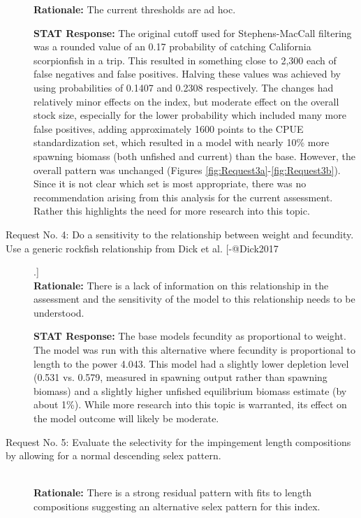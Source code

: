 \documentclass[12pt,]{article}
\begin{document}
\begin{description}
\textbf{Rationale:} The current thresholds are ad hoc.  
    
  
\textbf{STAT Response:} The original cutoff used for Stephens-MacCall filtering 
was a rounded value of an 0.17 probability of catching California scorpionfish 
in a trip. This resulted in something close to 2,300 each of false negatives 
and false positives. Halving these values was achieved by using probabilities 
of 0.1407 and 0.2308 respectively. The changes had relatively minor effects 
on the index, but  moderate effect on the overall stock size, especially for 
the lower probability which included many more false positives, adding approximately 1600
points to the CPUE standardization set, which resulted in a model with nearly 
10\% more spawning biomass (both unfished and current) than the base. However, 
the overall pattern was unchanged (Figures \ref{fig:Request3a}-\ref{fig:Request3b}). 
Since it is not clear which set is most 
appropriate, there was no recommendation arising from this analysis for the 
current assessment. Rather this highlights the need for more research into 
this topic.

\item[Request No. 4: Do a sensitivity to the relationship between weight and
fecundity.  Use a generic rockfish relationship from Dick et al. [-@Dick2017].] \hfill \\

\textbf{Rationale:} There is a lack of information on this relationship in 
the assessment and the sensitivity of the model to this relationship needs 
to be understood.   
    
    
\textbf{STAT Response:} The base models fecundity as proportional to weight. 
The model was run with this alternative where fecundity is proportional to 
length to the power 4.043. This model had a slightly lower depletion level 
(0.531 vs. 0.579, measured in spawning output rather than spawning biomass) 
and a slightly higher unfished equilibrium biomass estimate (by about 1\%). 
While more research into this topic is warranted, its effect on the model 
outcome will likely be moderate.


\item[Request No. 5: Evaluate the selectivity for the impingement length compositions 
by allowing for a normal descending selex pattern.] \hfill \\

\textbf{Rationale:} There is a strong residual pattern with fits to length 
compositions suggesting an alternative selex pattern for this index. 
  

\end{description}
\end{document}
